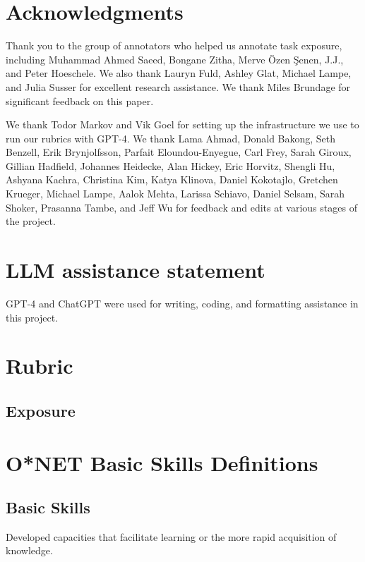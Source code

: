 \documentclass[11pt]{article}
\begin{document}
\section*{Acknowledgments}
Thank you to the group of annotators who helped us annotate task exposure, including Muhammad Ahmed Saeed, Bongane Zitha, Merve Özen Şenen, J.J., and Peter Hoeschele. We also thank Lauryn Fuld, Ashley Glat, Michael Lampe, and Julia Susser for excellent research assistance. We thank Miles Brundage for significant feedback on this paper.

We thank Todor Markov and Vik Goel for setting up the infrastructure we use to run our rubrics with GPT-4. We thank Lama Ahmad, Donald Bakong, Seth Benzell, Erik Brynjolfsson, Parfait Eloundou-Enyegue, Carl Frey, Sarah Giroux, Gillian Hadfield, Johannes Heidecke, Alan Hickey, Eric Horvitz, Shengli Hu, Ashyana Kachra, Christina Kim, Katya Klinova, Daniel Kokotajlo, Gretchen Krueger, Michael Lampe, Aalok Mehta, Larissa Schiavo, Daniel Selsam, Sarah Shoker, Prasanna Tambe, and Jeff Wu for feedback and edits at various stages of the project.

\section*{LLM assistance statement}
GPT-4 and ChatGPT were used for writing, coding, and formatting assistance in this project.

\appendix

\section{Rubric}\label{taxonomies}

\subsection{Exposure} \label{exposure_tax} 



\section{O*NET Basic Skills Definitions}
\label{sec:skills_definitions}

\subsection*{Basic Skills}

Developed capacities that facilitate learning or the more rapid acquisition of knowledge.
\end{document}
